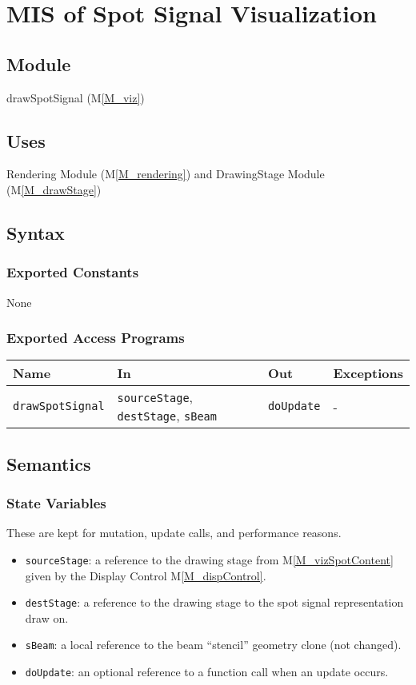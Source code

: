 \documentclass[12pt, titlepage]{article}
\newcommand{\mref}[1]{M\ref{#1}}
\newcommand{\mrefp}[1]{(\mref{#1})}
\newcommand{\mreff}[1]{Module \mrefp{#1}}
\newcommand{\code}[1]{\texttt{#1}}
\begin{document}
\newpage



\section{MIS of Spot Signal Visualization} \label{MS_vizSpotSignal}

\subsection{Module}
drawSpotSignal \mrefp{M_viz}

\subsection{Uses}
Rendering \mreff{M_rendering} and DrawingStage \mreff{M_drawStage}

\subsection{Syntax}

\subsubsection{Exported Constants}
None
\subsubsection{Exported Access Programs}

\begin{center}
\begin{tabular}{p{5cm} p{4cm} p{4cm} p{2cm}}
\hline
\textbf{Name} & \textbf{In} & \textbf{Out} & \textbf{Exceptions} \\
\hline
\code{drawSpotSignal} & \code{sourceStage}, \code{destStage}, \code{sBeam}
  & \code{doUpdate} & - \\
\hline
\end{tabular}
\end{center}

\subsection{Semantics}

\subsubsection{State Variables}
These are kept for mutation, update calls, and performance reasons.
\begin{itemize}
  \item \code{sourceStage}: a reference to the drawing stage from \mref{M_vizSpotContent}
    given by the Display Control \mref{M_dispControl}.
  \item \code{destStage}: a reference to the drawing stage to the spot signal
    representation draw on.
  \item \code{sBeam}: a local reference to the beam ``stencil'' geometry clone (not changed).
  \item \code{doUpdate}: an optional reference to a function call when an update occurs.
\end{itemize}
\end{document}
